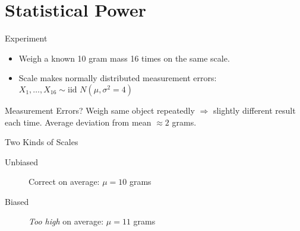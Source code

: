 \section{Statistical Power}
\begin{frame}
\begin{block}
	{Experiment}
	\begin{itemize}
		\item Weigh a known 10 gram mass 16 times on the same scale.
		\item Scale makes normally distributed measurement errors:
		$X_1, \hdots, X_{16} \sim \mbox{iid } N( \mu, \sigma^2 = 4)$
	\end{itemize}
\end{block}
\begin{alertblock}
			{Measurement Errors?}
		 Weigh same object repeatedly $\Rightarrow$ slightly different result each time. Average deviation from mean $\approx 2$ grams.
		\end{alertblock}
\begin{block}{Two Kinds of Scales}
	\begin{description}
			\item[Unbiased] Correct on average: $\mu = 10$ grams
			\item[Biased] \emph{Too high} on average: $\mu = 11$ grams
		\end{description}	
		
\end{block}

\end{frame}


